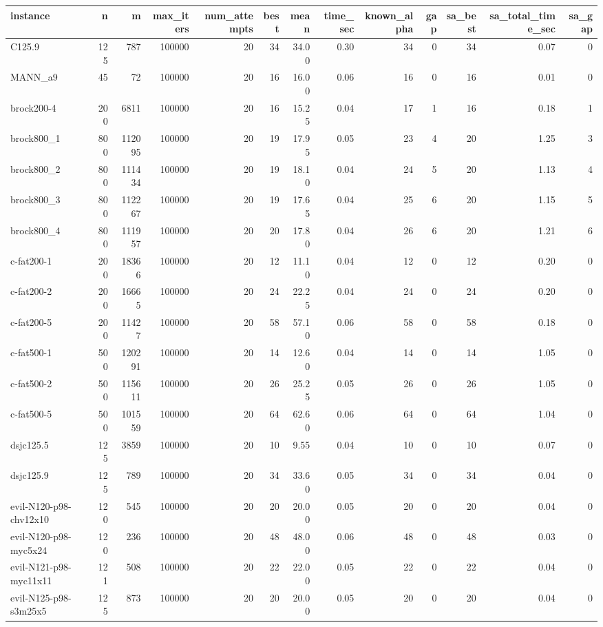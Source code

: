 \begin{tabular}{lrrrrrrrrrrrr}
\toprule
instance & n & m & max\_iters & num\_attempts & best & mean & time\_sec & known\_alpha & gap & sa\_best & sa\_total\_time\_sec & sa\_gap \\
\midrule
C125.9 & 125 & 787 & 100000 & 20 & 34 & 34.00 & 0.30 & 34 & 0 & 34 & 0.07 & 0 \\
MANN\_a9 & 45 & 72 & 100000 & 20 & 16 & 16.00 & 0.06 & 16 & 0 & 16 & 0.01 & 0 \\
brock200-4 & 200 & 6811 & 100000 & 20 & 16 & 15.25 & 0.04 & 17 & 1 & 16 & 0.18 & 1 \\
brock800\_1 & 800 & 112095 & 100000 & 20 & 19 & 17.95 & 0.05 & 23 & 4 & 20 & 1.25 & 3 \\
brock800\_2 & 800 & 111434 & 100000 & 20 & 19 & 18.10 & 0.04 & 24 & 5 & 20 & 1.13 & 4 \\
brock800\_3 & 800 & 112267 & 100000 & 20 & 19 & 17.65 & 0.04 & 25 & 6 & 20 & 1.15 & 5 \\
brock800\_4 & 800 & 111957 & 100000 & 20 & 20 & 17.80 & 0.04 & 26 & 6 & 20 & 1.21 & 6 \\
c-fat200-1 & 200 & 18366 & 100000 & 20 & 12 & 11.10 & 0.04 & 12 & 0 & 12 & 0.20 & 0 \\
c-fat200-2 & 200 & 16665 & 100000 & 20 & 24 & 22.25 & 0.04 & 24 & 0 & 24 & 0.20 & 0 \\
c-fat200-5 & 200 & 11427 & 100000 & 20 & 58 & 57.10 & 0.06 & 58 & 0 & 58 & 0.18 & 0 \\
c-fat500-1 & 500 & 120291 & 100000 & 20 & 14 & 12.60 & 0.04 & 14 & 0 & 14 & 1.05 & 0 \\
c-fat500-2 & 500 & 115611 & 100000 & 20 & 26 & 25.25 & 0.05 & 26 & 0 & 26 & 1.05 & 0 \\
c-fat500-5 & 500 & 101559 & 100000 & 20 & 64 & 62.60 & 0.06 & 64 & 0 & 64 & 1.04 & 0 \\
dsjc125.5 & 125 & 3859 & 100000 & 20 & 10 & 9.55 & 0.04 & 10 & 0 & 10 & 0.07 & 0 \\
dsjc125.9 & 125 & 789 & 100000 & 20 & 34 & 33.60 & 0.05 & 34 & 0 & 34 & 0.04 & 0 \\
evil-N120-p98-chv12x10 & 120 & 545 & 100000 & 20 & 20 & 20.00 & 0.05 & 20 & 0 & 20 & 0.04 & 0 \\
evil-N120-p98-myc5x24 & 120 & 236 & 100000 & 20 & 48 & 48.00 & 0.06 & 48 & 0 & 48 & 0.03 & 0 \\
evil-N121-p98-myc11x11 & 121 & 508 & 100000 & 20 & 22 & 22.00 & 0.05 & 22 & 0 & 22 & 0.04 & 0 \\
evil-N125-p98-s3m25x5 & 125 & 873 & 100000 & 20 & 20 & 20.00 & 0.05 & 20 & 0 & 20 & 0.04 & 0 \\

\end{tabular}
